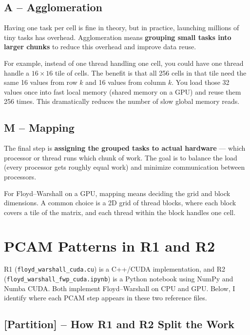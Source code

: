 \documentclass[11pt]{article}
\begin{document}
\subsection*{A -- Agglomeration}

Having one task per cell is fine in theory, but in practice, launching millions of tiny tasks has overhead. Agglomeration means \textbf{grouping small tasks into larger chunks} to reduce this overhead and improve data reuse.

For example, instead of one thread handling one cell, you could have one thread handle a $16 \times 16$ tile of cells. The benefit is that all 256 cells in that tile need the same 16 values from row $k$ and 16 values from column $k$. You load those 32 values once into fast local memory (shared memory on a GPU) and reuse them 256 times. This dramatically reduces the number of slow global memory reads.

\subsection*{M -- Mapping}

The final step is \textbf{assigning the grouped tasks to actual hardware} --- which processor or thread runs which chunk of work. The goal is to balance the load (every processor gets roughly equal work) and minimize communication between processors.

For Floyd--Warshall on a GPU, mapping means deciding the grid and block dimensions. A common choice is a 2D grid of thread blocks, where each block covers a tile of the matrix, and each thread within the block handles one cell.

\section{PCAM Patterns in R1 and R2}

R1 (\texttt{floyd\_warshall\_cuda.cu}) is a C++/CUDA implementation, and R2 (\texttt{floyd\_warshall\_fwp\_cuda.ipynb}) is a Python notebook using NumPy and Numba CUDA. Both implement Floyd--Warshall on CPU and GPU. Below, I identify where each PCAM step appears in these two reference files.

\subsection*{[Partition] -- How R1 and R2 Split the Work}
\end{document}
